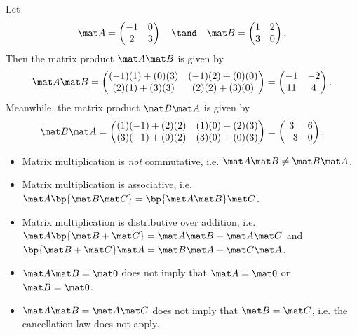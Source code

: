 \begin{example}
    Let \[\mat A = \begin{pmatrix}-1 & 0 \\ 2 & 3\end{pmatrix} \quad \tand \quad \mat B = \begin{pmatrix}1 & 2 \\ 3 & 0\end{pmatrix}.\] Then the matrix product $\mat A \mat B$ is given by \[\mat A \mat B = \begin{pmatrix}(-1)(1) + (0)(3) & (-1)(2) + (0)(0) \\ (2)(1) + (3)(3) & (2)(2) + (3)(0)\end{pmatrix} = \begin{pmatrix}-1 & -2 \\ 11 & 4\end{pmatrix}.\] Meanwhile, the matrix product $\mat B \mat A$ is given by \[\mat B \mat A = \begin{pmatrix}(1)(-1) + (2)(2) & (1)(0) + (2)(3) \\ (3)(-1) + (0)(2) & (3)(0) + (0)(3)\end{pmatrix} = \begin{pmatrix}3 & 6 \\ -3 & 0\end{pmatrix}.\]
\end{example}

\begin{fact}
    \phantom{.}
    \begin{itemize}
        \item Matrix multiplication is \emph{not} commutative, i.e. $\mat A \mat B \neq \mat B \mat A$.
        \item Matrix multiplication is associative, i.e. $\mat A \bp{\mat B \mat C} = \bp{\mat A \mat B} \mat C$.
        \item Matrix multiplication is distributive over addition, i.e. $\mat A \bp{\mat B + \mat C} = \mat A \mat B + \mat A \mat C$ and $\bp{\mat B + \mat C} \mat A = \mat B \mat A + \mat C \mat A$.
        \item $\mat A \mat B = \mat 0$ does not imply that $\mat A = \mat 0$ or $\mat B = \mat 0$.
        \item $\mat A \mat B = \mat A \mat C$ does not imply that $\mat B = \mat C$, i.e. the cancellation law does not apply.
    \end{itemize}
\end{fact}

